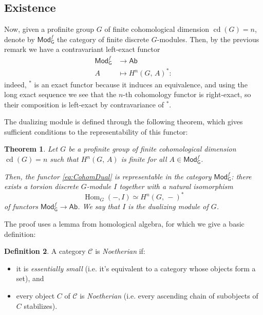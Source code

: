 \documentclass[a4paper]{report}
\def\Gfmod{\mathsf{Mod}_{\mathsf{G}}^f}
\def\Ab{\mathsf{Ab}}
\renewcommand{\H}[3]{H^{#1}( #2, \, #3 )}
\DeclareMathOperator{\Hom}{Hom}
\DeclareMathOperator{\cd}{cd}
\theoremstyle{plain}
\newtheorem{theorem}{Theorem}[section]
\theoremstyle{definition}
\newtheorem{definition}[theorem]{Definition}
\theoremstyle{remark}
\begin{document}
\subsection{Existence}

Now, given a profinite group \(G\) of finite cohomological dimension \(\cd(G)=n\), denote by \(\Gfmod\) the category of finite discrete \(G\)-modules.
Then, by the previous remark we have a contravariant left-exact functor
\begin{align}\label{eq:CohomDual}
    \Gfmod & \to \Ab                \\
    A      & \mapsto \H{n}{G}{A}^*:
\end{align}
indeed, \(^*\) is an exact functor because it induces an equivalence, and using the long exact sequence we see that the \(n\)-th cohomology functor is right-exact, so their composition is left-exact by contravariance of \(^*\).

The dualizing module is defined through the following theorem, which gives sufficient conditions to the representability of this functor:

\begin{theorem}\label{thm:DualMod}
    Let \(G\) be a profinite group of finite cohomological dimension \(\cd(G)=n\) such that \(\H{n}{G}{A}\) is finite for all \(A\in\Gfmod\).

    Then, the functor \eqref{eq:CohomDual} is representable in the category \(\Gfmod\): there exists a torsion discrete \(G\)-module \(I\) together with a natural isomorphism
    \[
        \Hom_G\left( -,I \right) \simeq \H{n}{G}{-}^*
    \]
    of functors \(\Gfmod\to\Ab\). We say that \(I\) is the \textit{dualizing module} of \(G\).
\end{theorem}

The proof uses a lemma from homological algebra, for which we give a basic definition:

\begin{definition}
    A category \(\mathcal{C}\) is \textit{Noetherian} if:
    \begin{itemize}
        \item it is \textit{essentially small} (i.e. it's equivalent to a category whose objects form a set), and
        \item every object \(C\) of \(\mathcal{C}\) is \textit{Noetherian} (i.e. every ascending chain of subobjects of \(C\) stabilizes).
    \end{itemize}
\end{definition}
\end{document}
